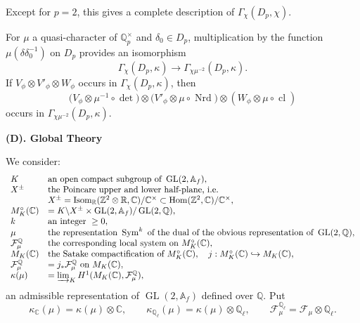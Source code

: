 \documentclass[11pt]{article}
\newcommand{\Q}{\mathbb{Q}}
\newcommand{\Z}{\mathbb{Z}}
\newcommand{\C}{\mathbb{C}}
\newcommand{\Qp}{\mathbb{Q}_{p}}
\newcommand{\Ql}{\mathbb{Q}_{\ell}}
\newcommand{\Af}{\mathbb{A}_{f}}
\newcommand{\Hom}{\operatorname{Hom}}
\newcommand{\Isom}{\operatorname{Isom}}
\newcommand{\GL}{\operatorname{GL}}
\newcommand{\Sym}{\operatorname{Sym}}
\newcommand{\Nrd}{\operatorname{Nrd}}
\newcommand{\cl}{\operatorname{cl}}
\newcommand{\Lim}{\varinjlim}
\begin{document}
Except for \(p=2\), this gives a complete description of \(\Gamma_{\chi}(D_p,\chi)\).

For \(\mu\) a quasi-character of \(\Qp^\times\) and \(\delta_0\in D_p\), multiplication by the function \(\mu(\delta\delta_0^{-1})\) on \(D_p\) provides an isomorphism
\[
\Gamma_{\chi}(D_p,\kappa)\longrightarrow
\Gamma_{\chi\mu^{-2}}(D_p,\kappa).
\]
If \(V_{\phi}\otimes V'_{\phi}\otimes W_{\phi}\) occurs in \(\Gamma_{\chi}(D_p,\kappa)\), then
\[
\bigl(V_{\phi}\otimes\mu^{-1}\circ\det\bigr)\otimes
\bigl(V'_{\phi}\otimes\mu\circ\Nrd\bigr)\otimes
(W_{\phi}\otimes\mu\circ\cl)
\]
occurs in \(\Gamma_{\chi\mu^{-2}}(D_p,\kappa)\).

\begin{center}
\textbf{(D). Global Theory}
\end{center}

We consider:
\[
\begin{array}{ll}
K & \text{an open compact subgroup of }\GL(2,\Af),\\
X^{\pm} & \text{the Poincare upper and lower half-plane, i.e.}\\
& X^{\pm}=\Isom_{\mathbb R}(\Z^2\otimes\mathbb R,\C)/\C^{\times}
\subset\Hom(\Z^2,\C)/\C^{\times},\\
M_K^{\circ}(\C) & =K\backslash X^{\pm}\times\GL(2,\Af)/\GL(2,\Q),\\
k & \text{an integer } \geq0,\\
\mu & \text{the representation }\Sym^k\text{ of the dual of the obvious representation of }\GL(2,\Q),\\
\mathcal F_{\mu}^{\Q} & \text{the corresponding local system on }M_K^{\circ}(\C),\\
M_K(\C) & \text{the Satake compactification of }M_K^{\circ}(\C),\quad
j:M_K^{\circ}(\C)\hookrightarrow M_K(\C),\\
\mathcal F_{\mu}^{\Q} & =j_*\mathcal F_{\mu}^{\Q}\text{ on }M_K(\C),\\
\kappa(\mu) & =\Lim_K H^1(M_K(\C),\mathcal F_{\mu}^{\Q}),
\end{array}
\]
an admissible representation of \(\GL(2,\Af)\) defined over \(\Q\). Put
\[
\kappa_{\C}(\mu)=\kappa(\mu)\otimes\C,\qquad
\kappa_{\Ql}(\mu)=\kappa(\mu)\otimes\Ql,\qquad
\mathcal F_{\mu}^{\Ql}=\mathcal F_{\mu}\otimes\Ql .
\]
\end{document}
